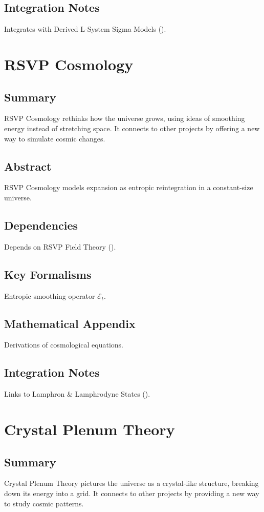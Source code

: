 \documentclass[11pt,oneside]{memoir}
\theoremstyle{plain}
\newcommand{\E}{\mathcal{E}}
\begin{document}
\section{Integration Notes}
Integrates with Derived L-System Sigma Models ().

\chapter{RSVP Cosmology}
\label{sec:rsvp_cosmology}
\section{Summary}
RSVP Cosmology rethinks how the universe grows, using ideas of smoothing energy instead of stretching space. It connects to other projects by offering a new way to simulate cosmic changes.

\section{Abstract}
RSVP Cosmology models expansion as entropic reintegration in a constant-size universe.

\section{Dependencies}
Depends on RSVP Field Theory ().

\section{Key Formalisms}
Entropic smoothing operator \(\E_t\).

\section{Mathematical Appendix}
Derivations of cosmological equations.

\section{Integration Notes}
Links to Lamphron \& Lamphrodyne States ().

\chapter{Crystal Plenum Theory}
\label{sec:crystal_plenum}
\section{Summary}
Crystal Plenum Theory pictures the universe as a crystal-like structure, breaking down its energy into a grid. It connects to other projects by providing a new way to study cosmic patterns.
\end{document}
